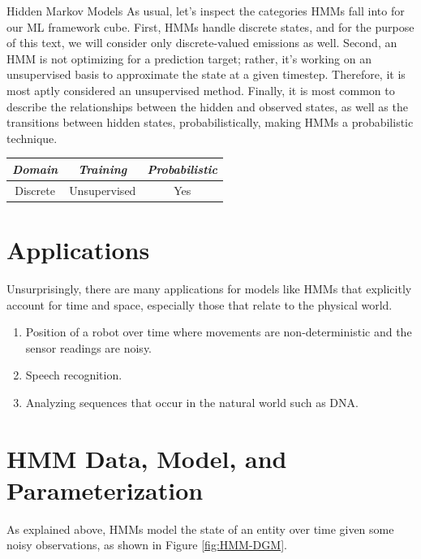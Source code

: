 \begin{mlcube}{Hidden Markov Models}
As usual, let's inspect the categories HMMs fall into for our ML framework cube. First, HMMs handle discrete states, and for the purpose of this text, we will consider only discrete-valued emissions as well. Second, an HMM is not optimizing for a prediction target; rather, it's working on an unsupervised basis to approximate the state at a given timestep. Therefore, it is most aptly considered an unsupervised method. Finally, it is most common to describe the relationships between the hidden and observed states, as well as the transitions between hidden states, probabilistically, making HMMs a probabilistic technique.
\begin{center}
    \begin{tabular}{c|c|c}
    \textit{\textbf{Domain}} & \textit{\textbf{Training}} & \textit{\textbf{Probabilistic}} \\
    \hline
    Discrete & Unsupervised & Yes \\
    \end{tabular}
\end{center}
\end{mlcube}

\section{Applications}
Unsurprisingly, there are many applications for models like HMMs that explicitly account for time and space, especially those that relate to the physical world.
\begin{enumerate}
    \item Position of a robot over time where movements are non-deterministic and the sensor readings are noisy.
    \item Speech recognition.
    \item Analyzing sequences that occur in the natural world such as DNA.
\end{enumerate}

\section{HMM Data, Model, and Parameterization}
As explained above, HMMs model the state of an entity over time given some noisy observations, as shown in Figure \ref{fig:HMM-DGM}.

